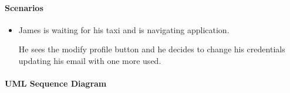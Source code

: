 \paragraph{Scenarios}
\begin{itemize}
	\item James is waiting for his taxi and is navigating \myTaxiService{} application. \par He sees the modify profile button and he decides to change his credentials updating his email with one more used.
\end{itemize}
\paragraph{UML Sequence Diagram}
